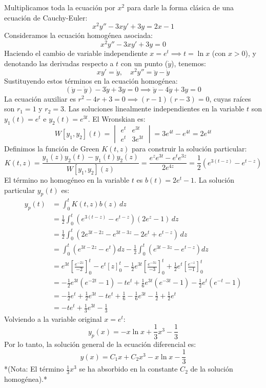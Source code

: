 \documentclass[12pt,letterpaper]{article}
\begin{document}
Multiplicamos toda la ecuación por $x^2$ para darle la forma clásica de una ecuación de Cauchy-Euler:
\[
  x^2 y'' - 3xy' + 3y = 2x - 1
\]
Consideramos la ecuación homogénea asociada:
\[
  x^2 y'' - 3xy' + 3y = 0
\]
Haciendo el cambio de variable independiente $x = e^t \implies t = \ln x$ (con $x > 0$), y denotando las derivadas respecto a $t$ con un punto ($\dot{y}$), tenemos:
\[
  xy' = \dot{y}, \quad x^2 y'' = \ddot{y} - \dot{y}
\]
Sustituyendo estos términos en la ecuación homogénea:
\[
  (\ddot{y} - \dot{y}) - 3\dot{y} + 3y = 0 \implies \ddot{y} - 4\dot{y} + 3y = 0
\]
La ecuación auxiliar es $r^2 - 4r + 3 = 0 \implies (r-1)(r-3) = 0$, cuyas raíces son $r_1 = 1$ y $r_2 = 3$. Las soluciones linealmente independientes en la variable $t$ son $y_1(t) = e^t$ e $y_2(t) = e^{3t}$.
El Wronskian es:
\[
  W[y_1, y_2](t) = \begin{vmatrix} e^t & e^{3t} \\ e^t & 3e^{3t} \end{vmatrix} = 3e^{4t} - e^{4t} = 2e^{4t}
\]
Definimos la función de Green $K(t, z)$ para construir la solución particular:
\[
  K(t, z) = \frac{y_1(z)y_2(t) - y_1(t)y_2(z)}{W[y_1, y_2](z)} = \frac{e^z e^{3t} - e^t e^{3z}}{2e^{4z}} = \frac{1}{2}\left(e^{3(t-z)} - e^{t-z}\right)
\]
El término no homogéneo en la variable $t$ es $b(t) = 2e^t - 1$. La solución particular $y_p(t)$ es:
\begin{align*}
  y_p(t) &= \int_0^t K(t, z) b(z) \, dz \\
  &= \frac{1}{2} \int_0^t \left(e^{3(t-z)} - e^{t-z}\right)(2e^z - 1) \, dz \\
  &= \frac{1}{2} \int_0^t \left( 2e^{3t-2z} - e^{3t-3z} - 2e^t + e^{t-z} \right) \, dz \\
  &= \int_0^t \left(e^{3t-2z} - e^t\right)dz - \frac{1}{2} \int_0^t \left(e^{3t-3z} - e^{t-z}\right)dz \\
  &= e^{3t} \left[ \frac{e^{-2z}}{-2} \right]_0^t - e^t [z]_0^t - \frac{1}{2} e^{3t} \left[ \frac{e^{-3z}}{-3} \right]_0^t + \frac{1}{2} e^t \left[ \frac{e^{-z}}{-1} \right]_0^t \\
  &= -\frac{1}{2} e^{3t}\left(e^{-2t} - 1\right) - te^t + \frac{1}{6} e^{3t}\left(e^{-3t} - 1\right) - \frac{1}{2}e^t \left(e^{-t} - 1\right) \\
  &= -\frac{1}{2}e^t + \frac{1}{2}e^{3t} - te^t + \frac{1}{6} - \frac{1}{6}e^{3t} - \frac{1}{2} + \frac{1}{2}e^t \\
  &= -te^t + \frac{1}{3}e^{3t} - \frac{1}{3}
\end{align*}
Volviendo a la variable original $x = e^t$:
\[
  y_p(x) = -x\ln x + \frac{1}{3}x^3 - \frac{1}{3}
\]
Por lo tanto, la solución general de la ecuación diferencial es:
\[
  y(x) = C_1 x + C_2 x^3 - x\ln x - \frac{1}{3}
\]
*(Nota: El término $\frac{1}{3}x^3$ se ha absorbido en la constante $C_2$ de la solución homogénea).*
\end{document}
